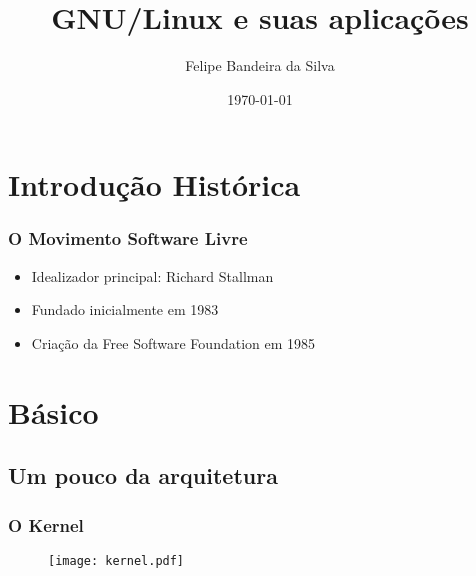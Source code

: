 \documentclass{beamer}
\title[GNU/Linux]{GNU/Linux e suas aplicações} %
\author{Felipe Bandeira da Silva} %
\institute[Unifor] %
{
Universidade de Fortaleza\\Universidade de Federal do Ceará\\ %
\medskip
\textit{felipeband18@gmail.com} %
}
\date{\today} %
\begin{document}
\begin{frame}
\titlepage %
\end{frame}



\section{Introdução Histórica} %

\begin{frame}
\frametitle{O Movimento Software Livre}
\begin{itemize}
    \item Idealizador principal: Richard Stallman
    \item Fundado inicialmente em 1983
    \item Criação da Free Software Foundation em 1985
\end{itemize}
\end{frame}


\section{Básico}

\subsection{Um pouco da arquitetura}
\begin{frame}
    \frametitle{O Kernel}
    \begin{figure}
        \texttt{[image: kernel.pdf]}
    \end{figure}
\end{frame}
\end{document}
